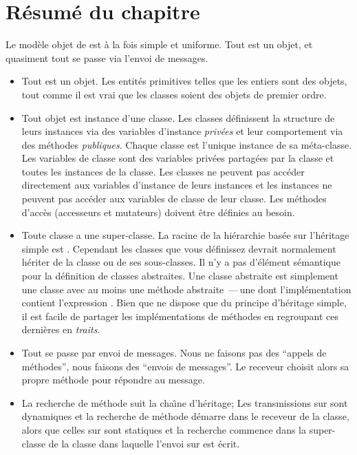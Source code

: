\documentclass[a4paper,10pt,twoside]{book}
\begin{document}
\section{R\'esum\'e du chapitre}

Le mod\`ele objet de \squeak est \`a la fois simple et uniforme.
Tout est un objet, et quasiment tout se passe via l'envoi de messages.

\begin{itemize}
  \item Tout est un objet.
  Les entit\'es primitives telles que les entiers sont des objets, tout comme
il est vrai que les classes soient des objets de premier ordre.

  \item Tout objet est instance d'une classe.
Les classes d\'efinissent la structure de leurs instances via des
variables d'instance \emph{priv\'ees} et leur comportement 
via des m\'ethodes \emph{publiques}. Chaque classe est l'unique
instance de sa m\'eta-classe.
Les variables de classe sont des variables priv\'ees partag\'ees par la classe
et toutes les instances de la classe.
Les classes ne peuvent pas acc\'eder directement aux variables d'instance de
leurs instances et les instances ne peuvent pas acc\'eder aux variables de
classe de leur classe.
Les m\'ethodes d'acc\`es (accesseurs et mutateurs) doivent \^etre
d\'efinies au besoin.  

  \item Toute classe a une super-classe.
  La racine de la hi\'erarchie bas\'ee sur l'h\'eritage simple est .
	Cependant les classes que vous d\'efinissez devrait normalement h\'eriter de la classe  ou de ses sous-classes.
Il n'y a pas d'\'el\'ement s\'emantique pour la d\'efinition de classes abstraites.
Une classe abstraite est simplement une classe avec au moins une m\'ethode abstraite
\,---\,une dont l'impl\'ementation contient l'expression 
.
  Bien que \squeak ne dispose que du principe d'h\'eritage simple, 
il est facile de partager les impl\'ementations de m\'ethodes
en regroupant ces derni\`eres en \emph{traits}.

  \item Tout se passe par envoi de messages.
	Nous ne faisons pas des ``appels de m\'ethodes'', nous
	faisons des ``envois de messages''.
Le receveur choisit alors sa propre m\'ethode pour r\'epondre au message.

  \item La recherche de m\'ethode suit la cha\^{\i}ne d'h\'eritage;
  Les transmissions sur \self sont dynamiques et la recherche de m\'ethode
d\'emarre dans le receveur de la classe, alors que
celles sur \super sont statiques
et la recherche commence dans la super-classe de la classe dans laquelle l'envoi
sur \super est \'ecrit.


\end{itemize}
\end{document}
